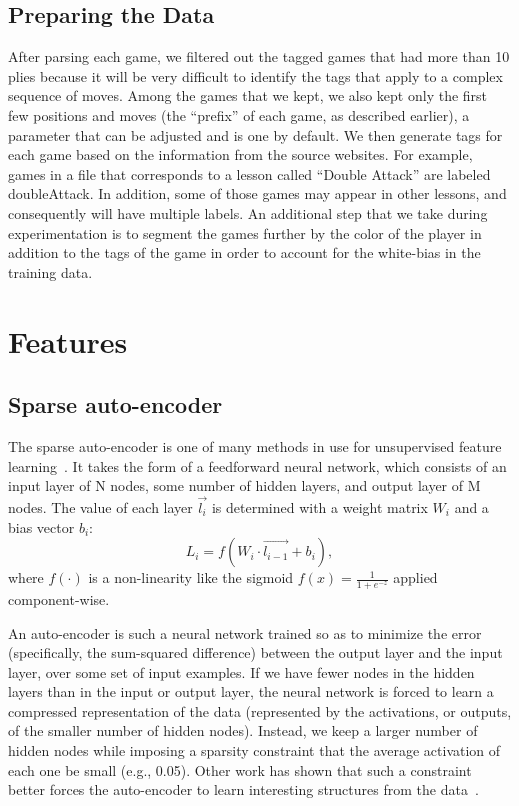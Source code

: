 \documentclass[11pt]{article}
\begin{document}
\subsection{Preparing the Data}
After parsing each game, we filtered out the tagged games that had more than 10 plies because it will be very difficult to identify the tags that apply to a complex sequence of moves. Among the games that we kept, we also kept only the first few positions and moves (the ``prefix'' of each game, as described earlier), a parameter that can be adjusted and is one by default. We then generate tags for each game based on the information from the source websites. For example, games in a file that corresponds to a lesson called ``Double Attack'' are labeled doubleAttack. In addition, some of those games may appear in other lessons, and consequently will have multiple labels. An additional step that we take during experimentation is to segment the games further by the color of the player in addition to the tags of the game in order to account for the white-bias in the training data.

\section{Features}
\subsection{Sparse auto-encoder}
The sparse auto-encoder is one of many methods in use for unsupervised feature learning~\cite{Coates}. It takes the form of a feedforward neural network, which consists of an input layer of N nodes, some number of hidden layers, and output layer of M nodes. The value of each layer $\vec{l_i}$ is determined with a weight matrix $W_i$ and a bias vector $b_i$: \[L_i = f(W_i \cdot \vec{l_{i-1}} + b_i),\] where $f(\cdot)$ is a non-linearity like the sigmoid $f(x) = \frac{1}{1 + e^{-z}}$ applied component-wise.

An auto-encoder is such a neural network trained so as to minimize the error (specifically, the sum-squared difference) between the output layer and the input layer, over some set of input examples. If we have fewer nodes in the hidden layers than in the input or output layer, the neural network is forced to learn a compressed representation of the data (represented by the activations, or outputs, of the smaller number of hidden nodes). Instead, we keep a larger number of hidden nodes while imposing a sparsity constraint that the average activation of each one be small (e.g., 0.05). Other work has shown that such a constraint better forces the auto-encoder to learn interesting structures from the data~\cite{bengio}.
\end{document}
